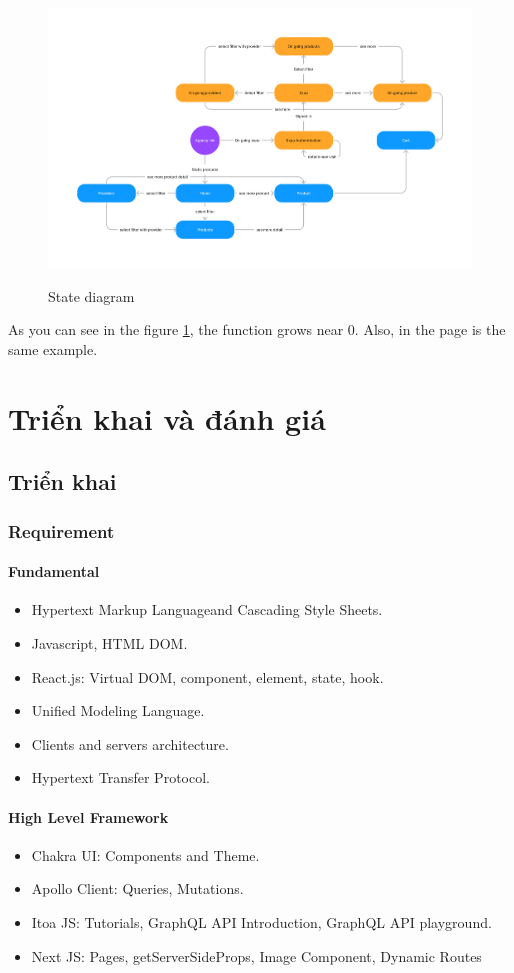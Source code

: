 \documentclass{report}
\begin{document}
\begin{figure}[h!]
	\caption{State diagram}
	\centering
	\includegraphics[width=\textwidth]{./images/state.png}
	\label{fig:state}
\end{figure}
As you can see in the figure \ref{fig:state}, the function grows near 0. Also, in the page \pageref{fig:state} is the same example.\pageref{fig:state}


\part{Triển khai và đánh giá}
\chapter{Triển khai}
\section{Requirement}
\subsection{Fundamental}
\begin{itemize}
	\item Hypertext Markup Languageand Cascading Style Sheets.
	\item Javascript, HTML DOM.
  	\item React.js: Virtual DOM, component, element, state, hook.
	\item Unified Modeling Language.
	\item Clients and servers architecture.
	\item Hypertext Transfer Protocol.
\end{itemize}

\subsection{High Level Framework}
\begin{itemize}
\item Chakra UI: Components and Theme.
\item Apollo Client: Queries, Mutations.
\item Itoa JS: Tutorials, GraphQL API Introduction, GraphQL API playground.
\item Next JS: Pages, getServerSideProps, Image Component, Dynamic Routes
\end{itemize}
\end{document}
